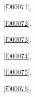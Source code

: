 \noindent\filesourcenumbernameone\ \ref{f000071},\ \pageref{f000071}%

\noindent\filesourcenumbernameone\ \ref{f000072},\ \pageref{f000072}%

\noindent\filesourcenumbernameone\ \ref{f000073},\ \pageref{f000073}%

\noindent\filesourcenumbernameone\ \ref{f000074},\ \pageref{f000074}%

\noindent\filesourcenumbernameone\ \ref{f000075},\ \pageref{f000075}%

\noindent\filesourcenumbernameone\ \ref{f000076},\ \pageref{f000076}%









